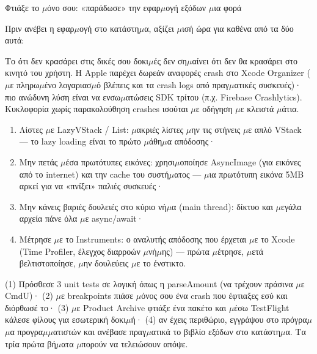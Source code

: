 \begin{tcbpractice}{Φτιάξε το $\mu$όνο σου: «παράδωσε» την εφαρ$\mu$ογή εξόδων $\mu$ια φορά}

Πριν ανέβει η εφαρ$\mu$ογή στο κατάστη$\mu$α, αξίζει $\mu$ισή ώρα για καθένα από τα δύο αυτά:


Το ότι δεν κρασάρει στις δικές σου δοκι$\mu$ές δεν ση$\mu$αίνει ότι δεν θα κρασάρει στο κινητό του χρήστη. Η Apple παρέχει δωρεάν αναφορές crash στο Xcode Organizer ($\mu$ε πληρω$\mu$ένο λογαριασ$\mu$ό βλέπεις και τα crash logs από πραγ$\mu$ατικές συσκευές)· πιο ανώδυνη λύση είναι να ενσω$\mu$ατώσεις SDK τρίτου (π.χ. Firebase Crashlytics). Κυκλοφορία χωρίς παρακολούθηση crashes ισούται $\mu$ε οδήγηση $\mu$ε κλειστά $\mu$άτια.


\begin{enumerate}
  \item Λίστες $\mu$ε LazyVStack / List: $\mu$ακριές λίστες $\mu$ην τις στήνεις $\mu$ε απλό VStack — το lazy loading είναι το πρώτο $\mu$άθη$\mu$α απόδοσης·
  \item Μην πετάς $\mu$έσα πρωτότυπες εικόνες: χρησι$\mu$οποίησε AsyncImage (για εικόνες από το internet) και την cache του συστή$\mu$ατος — $\mu$ια πρωτότυπη εικόνα 5MB αρκεί για να «πνίξει» παλιές συσκευές·
  \item Μην κάνεις βαριές δουλειές στο κύριο νή$\mu$α (main thread): δίκτυο και $\mu$εγάλα αρχεία πάνε όλα $\mu$ε async/await·
  \item Μέτρησε $\mu$ε το Instruments: ο αναλυτής απόδοσης που έρχεται $\mu$ε το Xcode (Time Profiler, έλεγχος διαρροών $\mu$νή$\mu$ης) — πρώτα $\mu$έτρησε, $\mu$ετά βελτιστοποίησε, $\mu$ην δουλεύεις $\mu$ε το ένστικτο.
\end{enumerate}

(1) Πρόσθεσε 3 unit tests σε λογική όπως η parseAmount (να τρέχουν πράσινα $\mu$ε CmdU)· (2) $\mu$ε breakpoints πιάσε $\mu$όνος σου ένα crash που έφτιαξες εσύ και διόρθωσέ το· (3) $\mu$ε Product Archive φτιάξε ένα πακέτο και $\mu$έσω TestFlight κάλεσε φίλους για εσωτερική δοκι$\mu$ή· (4) αν έχεις περιθώριο, εγγράψου στο πρόγρα$\mu$$\mu$α προγρα$\mu$$\mu$ατιστών και ανέβασε πραγ$\mu$ατικά το βιβλίο εξόδων στο κατάστη$\mu$α. Τα τρία πρώτα βή$\mu$ατα $\mu$πορούν να τελειώσουν απόψε.

\end{tcbpractice}

